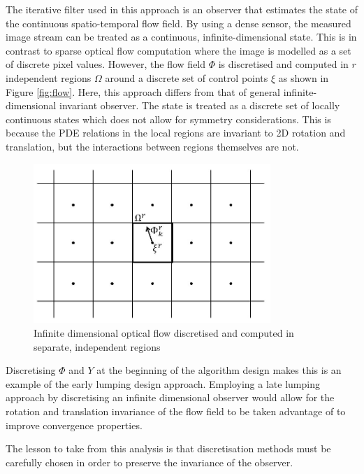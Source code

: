 The iterative filter used in this approach is an observer that estimates the state of the continuous spatio-temporal flow field. By using a dense sensor, the measured image stream can be treated as a continuous, infinite-dimensional state. This is in contrast to sparse optical flow computation where the image is modelled as a set of discrete pixel values. However, the flow field $\Phi$ is discretised and computed in $r$ independent regions $\Omega$ around a discrete set of control points $\xi$ as shown in Figure \ref{fig:flow}. Here, this approach differs from that of general infinite-dimensional invariant observer. The state is treated as a discrete set of locally continuous states which does not allow for symmetry considerations. This is because the PDE relations in the local regions are invariant to 2D rotation and translation, but the interactions between regions themselves are not. 

\begin{figure}
\centering
  \includegraphics[width=0.8\textwidth,trim = 0mm 0mm 0mm 0mm,clip]{./Figures/flow_regions.jpg}
  \caption{Infinite dimensional optical flow discretised and computed in separate, independent regions} \label{fig:flow_regions}
\end{figure} \label{fig:flow}

Discretising $\Phi$ and $Y$ at the beginning of the algorithm design makes this is an example of the early lumping design approach. Employing a late lumping approach by discretising an infinite dimensional observer would allow for the rotation and translation invariance of the flow field to be taken advantage of to improve convergence properties.

The lesson to take from this analysis is that discretisation methods must be carefully chosen in order to preserve the invariance of the observer.



